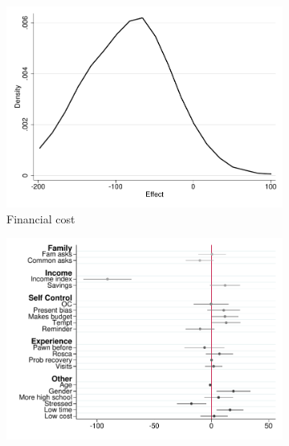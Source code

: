 \documentclass[11pt]{article}
\begin{document}



\begin{figure}[H]
    \caption{Heterogeneous Treatment Effect: Fee-forcing contract}
    \label{HTE_fee_forcing}
    \begin{center}
    \begin{subfigure}{0.4\textwidth}
        \caption{Financial cost}
        \centering
        \includegraphics[width=\textwidth]{Figuras/he_dist_fc_admin_disc_pro_2.pdf}
    \end{subfigure}
    \begin{subfigure}{0.4\textwidth}
        \caption*{}
        \centering
        \includegraphics[width=\textwidth]{Figuras/HE/he_int_vertical_fc_admin_disc_pro_2.pdf}

\end{subfigure}
\end{center}
\end{figure}
\end{document}
